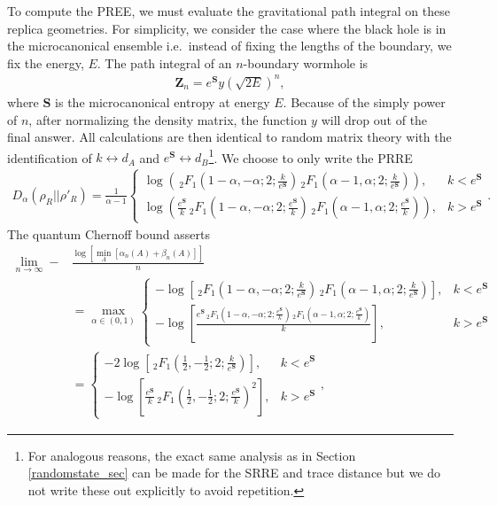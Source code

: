 \documentclass[a4paper,11pt]{article}
\newcommand*{\SR}[1]{\textcolor{magenta}{[SR: \textsf{#1}]}}
\begin{document}
To compute the PREE, we must evaluate the gravitational path integral on these replica geometries. For simplicity, we consider the case where the black hole is in the microcanonical ensemble i.e.~instead of fixing the lengths of the boundary, we fix the energy, $E$. The path integral of an $n$-boundary wormhole is \cite{2019arXiv191111977P}
\begin{align}
    \textbf{Z}_n = e^{\textbf{S}}y\left(\sqrt{2E}\right)^n,
\end{align}
where $\textbf{S}$ is the microcanonical entropy at energy $E$. Because of the simply power of $n$, after normalizing the density matrix, the function $y$ will drop out of the final answer. All calculations are then identical to random matrix theory with the identification of $k \leftrightarrow d_A$ and $e^\textbf{S} \leftrightarrow d_B$\footnote{For analogous reasons, the exact same analysis as in Section \ref{randomstate_sec} can be made for the SRRE 
and trace distance but we do not write these out explicitly to avoid repetition.}. We choose to only write the PRRE
\begin{align}
    D_{\alpha}(\rho_R|| \rho'_R) 
    = 
    \frac{1}{\alpha-1}
    \begin{cases}
    \log \left(\, _2F_1\left(1-\alpha,-\alpha;2;\frac{k}{e^\textbf{S}}\right) \,
   _2F_1\left(\alpha-1,\alpha;2;\frac{k}{e^\textbf{S}}\right)\right), & k < e^{\textbf{S}}
   \\
   \log \left(
   \frac{e^{\textbf{S}}}{k} \, _2F_1\left(1-\alpha,-\alpha;2;
   \frac{e^{\textbf{S}}}{k}\right) \,
   _2F_1\left(\alpha-1,\alpha;2;
   \frac{e^{\textbf{S}}}{k}\right) \right), & k > e^{\textbf{S}}
   \end{cases}.
   \label{PRRE_PSSY}
\end{align}
The quantum Chernoff bound asserts
\begin{align}
    \lim_{n\rightarrow \infty}-& \frac{\log\left[\min_{A}\left[ \alpha_n(A) + \beta_n(A) \right]\right] }{n} \nonumber
   \\
   &=\max_{\alpha \in (0, 1)}\begin{cases}- \log \left[\, _2F_1\left(1-\alpha,-\alpha;2;\frac{k}{e^\textbf{S}}\right) \,
   _2F_1\left(\alpha-1,\alpha;2;\frac{k}{e^\textbf{S}}\right)\right], & k < e^{\textbf{S}}
   \\
   - \log \left[\frac{e^{\textbf{S}}\, _2F_1\left(1-\alpha,-\alpha;2;\frac{e^\textbf{S}}{k}\right) \,
   _2F_1\left(\alpha-1,\alpha;2;\frac{e^\textbf{S}}{k}\right)}{k}\right], & k > e^{\textbf{S}}
   \end{cases}
    \nonumber
   \\
   &=  \begin{cases}- 2\log \left[\,
   _2F_1\left(\frac{1}{2},-\frac{1}{2};2;\frac{k}{e^\textbf{S}}\right) \right], & k < e^{\textbf{S}}
   \\
   -\log \left[\frac{e^\textbf{S}}{k}\,
   _2F_1\left(\frac{1}{2},-\frac{1}{2};2;\frac{e^\textbf{S}}{k}\right)^2 \right], & k > e^{\textbf{S}}
   \end{cases},
   \label{chernoff_PSSY}
\end{align}
\end{document}
